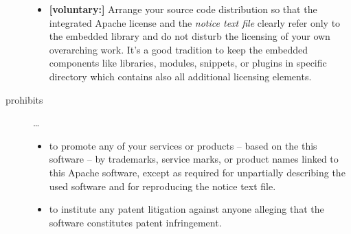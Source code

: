\begin{description}
\begin{itemize}
  \item \textbf{[voluntary:]} Arrange your source code distribution so that the
  integrated Apache license and the \emph{notice text file} clearly refer only
  to the embedded library and do not disturb the licensing of your own
  overarching work. It's a good tradition to keep the embedded components like
  libraries, modules, snippets, or plugins in specific directory which contains
  also all additional licensing elements.
 
\end{itemize}

\item[prohibits] \ldots
\begin{itemize}
  \item to promote any of your services or products – based on the this software
  – by trademarks, service marks, or product names linked to this Apache
  software, except as required for unpartially describing the used software and
  for reproducing the notice text file.
  \item to institute any patent litigation against anyone alleging that the
  software constitutes patent infringement.
\end{itemize}

\end{description}


